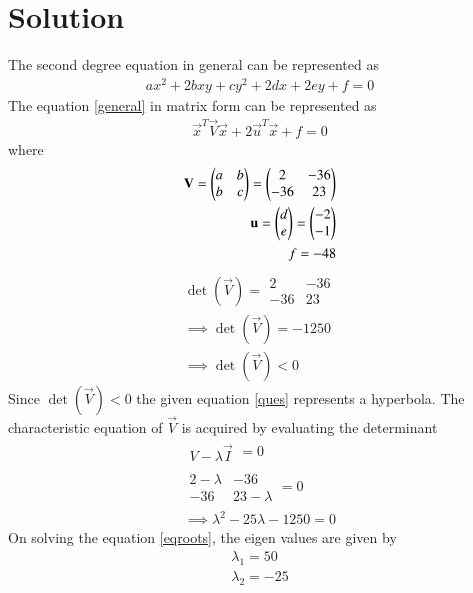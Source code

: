 \documentclass[journal,12pt,twocolumn]{IEEEtran}
\begin{document}
\section{Solution }
The second degree equation in general can be represented as
\begin{align}
    ax^2+2bxy+cy^2+2dx+2ey+f=0\label{general}
\end{align}
The equation \eqref{general} in matrix form can be represented as 
\begin{align}
\vec{x}^T\vec{V}\vec{x}+2\vec{u}^T\vec{x}+f=0\label{given}
\end{align}
where 
\begin{align}
\mathbf{V}=\begin{pmatrix}a&b\\b&c\end{pmatrix}=\begin{pmatrix}2 & -36\\-36 & 23\end{pmatrix}\\
\mathbf{u}=\begin{pmatrix}d\\e\end{pmatrix}=\begin{pmatrix}-2 \\ -1\end{pmatrix}\\
f=-48
\end{align}
\begin{align}
    \det(\vec{V})=\begin{array}{|cc|} 2 & -36\\-36 & 23 \end{array}\\
\implies\det(\vec{V})=-1250\\
\implies\det(\vec{V})<0
\end{align}
Since $\det(\vec{V})<0$ the given equation \eqref{ques} represents a hyperbola. The characteristic equation of $\vec{V}$ is acquired by evaluating the determinant 
\begin{align}
       \begin{array}{|c|}
V-\lambda\vec{I}
\end{array}=0\\
   \begin{array}{|cc|}
2-\lambda & -36 \\ -36 & 23-\lambda
\end{array}=0\\
\implies \lambda^2-25\lambda-1250=0\label{eqroots}
\end{align}
On solving the equation \eqref{eqroots}, the eigen values are given by 
\begin{align}
    \lambda_1=50\label{eqeig1}\\
    \lambda_2=-25\label{eqeig2}
\end{align}
\end{document}

